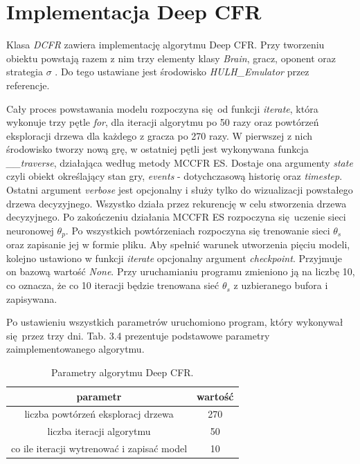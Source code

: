 \documentclass[12pt,oneside,a4paper]{report}
\begin{document}
\section{Implementacja Deep CFR}

Klasa \emph{DCFR} zawiera implementację algorytmu Deep CFR. 
Przy tworzeniu obiektu powstają razem z nim
trzy elementy klasy \emph{Brain}, gracz, oponent oraz strategia $\sigma$ .
Do tego ustawiane jest środowisko \emph{HULH\_Emulator} przez referencje.

Cały proces powstawania modelu rozpoczyna się od funkcji \emph{iterate}, która wykonuje trzy pętle
\emph{for},
dla iteracji algorytmu po 50 razy oraz powtórzeń eksploracji drzewa dla każdego z gracza po 270 razy. W pierwszej z nich 
środowisko tworzy nową grę, w ostatniej pętli jest wykonywana funkcja \emph{\_\_traverse},
działająca według metody MCCFR ES. Dostaje ona argumenty \emph{state} czyli obiekt określający
stan gry, \emph{events} - dotychczasową historię oraz \emph{timestep}.
Ostatni argument \emph{verbose} jest opcjonalny i służy tylko do wizualizacji powstałego drzewa
decyzyjnego. Wszystko działa przez rekurencję w celu stworzenia drzewa decyzyjnego.
Po zakończeniu działania MCCFR ES rozpoczyna się uczenie sieci neuronowej $\theta_{p}$.
Po wszystkich powtórzeniach rozpoczyna się trenowanie sieci $\theta_{s}$ oraz zapisanie jej w formie
pliku. Aby spełnić warunek 
utworzenia pięciu modeli, kolejno ustawiono w funkcji \emph{iterate} opcjonalny argument
\emph{checkpoint}. Przyjmuje on bazową wartość \emph{None}. Przy uruchamianiu programu zmieniono 
ją na liczbę 10, co oznacza, że co 10 iteracji będzie trenowana sieć $\theta_{s}$ z uzbieranego bufora
i zapisywana. 

Po ustawieniu wszystkich parametrów uruchomiono program, który wykonywał się przez trzy dni.
Tab. 3.4 prezentuje podstawowe parametry zaimplementowanego algorytmu.

\vspace{1cm}
\begin{table}[h!]
\centering
\caption{Parametry algorytmu Deep CFR.}
\begin{tabular}{|c|c| }
   \hline
   parametr & wartość \\
    \hline
   liczba powtórzeń eksploracj drzewa & 270  \\ 
   \hline
   liczba iteracji algorytmu & 50  \\  
   \hline
   co ile iteracji wytrenować i zapisać model & 10 \\
   \hline
\end{tabular}
\end{table}
\end{document}
